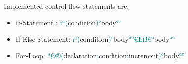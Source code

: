 Implemented control flow statements are:
\begin{itemize}[noitemsep]
    \item If-Statement : \textcolor{teal}{ıª(}condition\textcolor{teal}{)°}body\textcolor{teal}{°°}
    \item If-Else-Statement: \textcolor{teal}{ıª(}condition\textcolor{teal}{)°}body\textcolor{teal}{°°€Łẞ€°}body\textcolor{teal}{°°}
    \item For-Loop: \textcolor{teal}{ªØ®(}declaration\textcolor{teal}{;}condition\textcolor{teal}{;}increment\textcolor{teal}{)°}body\textcolor{teal}{°°}
\end{itemize}